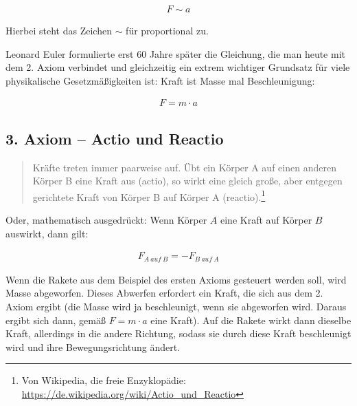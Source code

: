 \begin{align}
	F \sim a
\end{align}

\noindent Hierbei steht das Zeichen $\sim$ für \glqq proportional zu\grqq . 

Leonard Euler formulierte erst 60 Jahre später die Gleichung, die man heute mit dem 2. Axiom verbindet und gleichzeitig ein extrem wichtiger Grundsatz für viele physikalische Gesetzmäßigkeiten ist: \glqq Kraft ist Masse mal Beschleunigung\grqq :

\begin{align}	\label{eq:2.axiom}
	F = m \cdot a
\end{align}


\subsection{3. Axiom -- Actio und Reactio}

\begin{quote}
\glqq Kräfte treten immer paarweise auf. Übt ein Körper A auf einen anderen Körper B eine Kraft aus (actio), so wirkt eine gleich große, aber entgegen gerichtete Kraft von Körper B auf Körper A (reactio).\grqq \footnote{Von Wikipedia, die freie Enzyklopädie: \url{https://de.wikipedia.org/wiki/Actio_und_Reactio}}
\end{quote}

\noindent Oder, mathematisch ausgedrückt: Wenn Körper $A$ eine Kraft auf Körper $B$ auswirkt, dann gilt:

\begin{align}
	F_{A \ auf \ B} = -F_{B \ auf \ A}
\end{align}

\begin{Beispiel}
	Wenn die Rakete aus dem Beispiel des ersten Axioms gesteuert werden soll, wird Masse abgeworfen. Dieses Abwerfen erfordert ein Kraft, die sich aus dem 2. Axiom ergibt (die Masse wird ja beschleunigt, wenn sie abgeworfen wird. Daraus ergibt sich dann, gemäß $F=m \cdot a$ eine Kraft). Auf die Rakete wirkt dann dieselbe Kraft, allerdings in die andere Richtung, sodass sie durch diese Kraft beschleunigt wird und ihre Bewegungsrichtung ändert.
\end{Beispiel}





